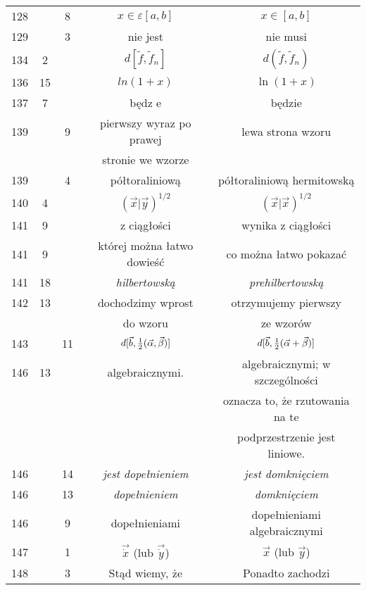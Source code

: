 \documentclass[a4paper,11pt]{article}
\newcommand{\veps}{\varepsilon}
\begin{document}
\begin{center}
\begin{tabular}{|c|c|c|c|c|}
    128 & &  8 & $x \in \veps [ a, b ]$ & $x \in [ a, b ]$ \\
    129 & &  3 & nie jest & nie musi \\
    134 &  2 & & $d[ \tilde{ f }, \tilde{ f }_{ n } ]$
           & $d( \tilde{ f }, \tilde{ f }_{ n } )$ \\
    136 & 15 & & $ln( 1 + x )$ & $\ln( 1 + x )$ \\
    137 &  7 & & będz e & będzie \\
    139 & &  9 & pierwszy wyraz po prawej & lewa strona wzoru \\
    & & & stronie we wzorze & \\
    139 & &  4 & półtoraliniową & półtoraliniową hermitowską \\
    140 &  4 & & $( \vec{ x } | \vec{ y } )^{ 1 / 2 }$
           & $( \vec{ x } | \vec{ x } )^{ 1 / 2 }$ \\
    141 &  9 & & z ciągłości & wynika z ciągłości \\
    141 &  9 & & której można łatwo dowieść & co można łatwo pokazać \\
    141 & 18 & & \emph{hilbertowską} & \emph{prehilbertowską} \\
    142 & 13 & & dochodzimy wprost & otrzymujemy pierwszy \\
    & & & do wzoru & ze wzorów \\
    143 & & 11 & $d[ \vec{ b }, \frac{ 1 }{ 2 } ( \vec{ \alpha },
                 \vec{ \beta }) ]$ 
           & $d[ \vec{ b }, \frac{ 1 }{ 2 } ( \vec{ \alpha }
             + \vec{ \beta }) ]$ \\
    146 & 13 & & algebraicznymi. & algebraicznymi; w szczególności \\
    & & & & oznacza to, że rzutowania na te \\
    & & & & podprzestrzenie jest liniowe. \\
    146 & & 14 & \emph{jest dopełnieniem} & \emph{jest domknięciem} \\
    146 & & 13 & \emph{dopełnieniem} & \emph{domknięciem} \\
    146 & &  9 & dopełnieniami & dopełnieniami algebraicznymi \\
    147 & &  1 & $\vec{ \dot{ x } }$ (lub $\vec{ \dot{ y } }$)
           & $\vec{ x }$ (lub $\vec{ y }$) \\
    148 & &  3 & Stąd wiemy, że & Ponadto zachodzi \\
    \hline
  \end{tabular}


\end{center}
\end{document}
